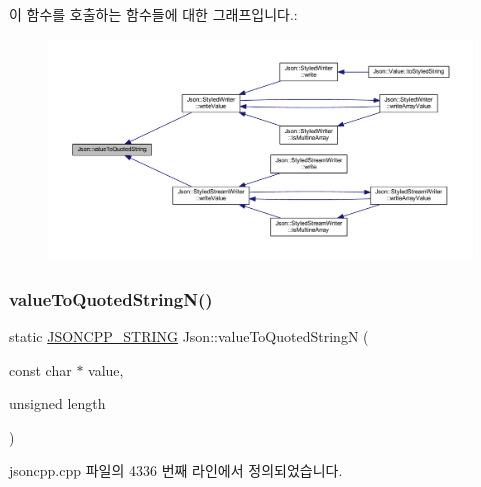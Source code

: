 이 함수를 호출하는 함수들에 대한 그래프입니다.\+:\nopagebreak
\begin{figure}[H]
\begin{center}
\leavevmode
\includegraphics[width=350pt]{namespace_json_aaf777a6923bcb4cf63a2729973fe5315_icgraph}
\end{center}
\end{figure}
\mbox{\label{namespace_json_a29aff81733b8fdaabf3f1acfc3ad339f}} 
\subsubsection{\texorpdfstring{value\+To\+Quoted\+String\+N()}{valueToQuotedStringN()}}
{\footnotesize\ttfamily static \hyperlink{json_8h_a1e723f95759de062585bc4a8fd3fa4be}{J\+S\+O\+N\+C\+P\+P\+\_\+\+S\+T\+R\+I\+NG} Json\+::value\+To\+Quoted\+StringN (\begin{DoxyParamCaption}\item[{const char $\ast$}]{value,  }\item[{unsigned}]{length }\end{DoxyParamCaption})\hspace{0.3cm}{\ttfamily [static]}}



jsoncpp.\+cpp 파일의 4336 번째 라인에서 정의되었습니다.


